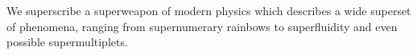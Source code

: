 We superscribe a superweapon of modern physics which describes a wide superset of phenomena, ranging from supernumerary rainbows to superfluidity and even possible supermultiplets.